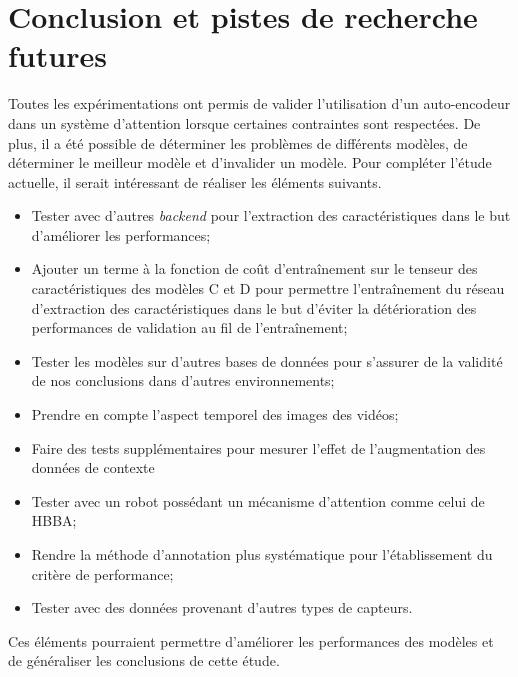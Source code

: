 \section{Conclusion et pistes de recherche futures}
    Toutes les expérimentations ont permis de valider l'utilisation d'un auto-encodeur dans un système d'attention lorsque certaines contraintes sont respectées. De plus, il a été possible de déterminer les problèmes de différents modèles, de déterminer le meilleur modèle et d'invalider un modèle. Pour compléter l'étude actuelle, il serait intéressant de réaliser les éléments suivants.

    \begin{itemize}
        \item Tester avec d'autres \textit{backend} pour l'extraction des caractéristiques dans le but d'améliorer les performances;
        \item Ajouter un terme à la fonction de coût d'entraînement sur le tenseur des caractéristiques des modèles C et D  pour permettre l'entraînement du réseau d'extraction des caractéristiques dans le but d'éviter la détérioration des performances de validation au fil de l'entraînement;
        \item Tester les modèles sur d'autres bases de données pour s'assurer de la validité de nos conclusions dans d'autres environnements;
        \item Prendre en compte l'aspect temporel des images des vidéos;
        \item Faire des tests supplémentaires pour mesurer l'effet de l'augmentation des données de contexte
        \item Tester avec un robot possédant un mécanisme d'attention comme celui de HBBA;
        \item Rendre la méthode d'annotation plus systématique pour l'établissement du critère de performance;
        \item Tester avec des données provenant d'autres types de capteurs.
    \end{itemize}
    
    Ces éléments pourraient permettre d'améliorer les performances des modèles et de généraliser les conclusions de cette étude.